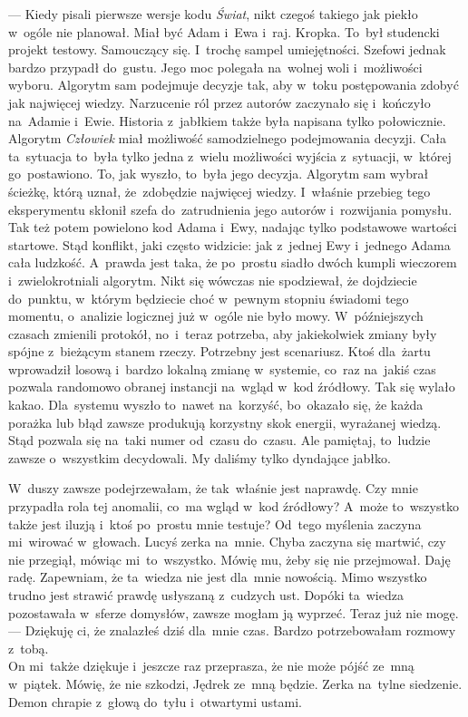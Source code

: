 \documentclass[9pt, a5paper]{memoir}
\begin{document}
--- Kiedy pisali pierwsze wersje kodu \textit{Świat}, nikt czegoś takiego jak piekło w~ogóle nie planował. Miał być Adam i~Ewa i~raj. Kropka. To~był studencki projekt testowy. Samouczący się. I~trochę sampel umiejętności. Szefowi jednak bardzo przypadł do~gustu. Jego moc polegała na~wolnej woli i~możliwości wyboru. Algorytm sam podejmuje decyzje tak, aby w~toku postępowania zdobyć jak najwięcej wiedzy. Narzucenie ról przez autorów zaczynało się i~kończyło na~Adamie i~Ewie. Historia z~jabłkiem także była napisana tylko połowicznie. Algorytm \textit{Człowiek} miał możliwość samodzielnego podejmowania decyzji. Cała ta~sytuacja to~była tylko jedna z~wielu możliwości wyjścia z~sytuacji, w~której go~postawiono. To, jak wyszło, to~była jego decyzja. Algorytm sam wybrał ścieżkę, którą uznał, że~zdobędzie najwięcej wiedzy. I~właśnie przebieg tego eksperymentu skłonił szefa do~zatrudnienia jego autorów i~rozwijania pomysłu. Tak też potem powielono kod Adama i~Ewy, nadając tylko podstawowe wartości startowe. Stąd konflikt, jaki często widzicie: jak z~jednej Ewy i~jednego Adama cała ludzkość. A~prawda jest taka, że po~prostu siadło dwóch kumpli wieczorem i~zwielokrotniali algorytm. Nikt się wówczas nie spodziewał, że dojdziecie do~punktu, w~którym będziecie choć w~pewnym stopniu świadomi tego momentu, o~analizie logicznej już w~ogóle nie było mowy. W~późniejszych czasach zmienili protokół, no~i~teraz potrzeba, aby jakiekolwiek zmiany były spójne z~bieżącym stanem rzeczy. Potrzebny jest scenariusz. Ktoś dla~żartu wprowadził losową i~bardzo lokalną zmianę w~systemie, co~raz na~jakiś czas pozwala randomowo obranej instancji na~wgląd w~kod źródłowy. Tak się wylało kakao. Dla~systemu wyszło to~nawet na~korzyść, bo~okazało się, że każda porażka lub błąd zawsze produkują korzystny skok energii, wyrażanej wiedzą. Stąd pozwala się na~taki numer od~czasu do~czasu. Ale pamiętaj, to~ludzie zawsze o~wszystkim decydowali. My daliśmy tylko dyndające jabłko.

W~duszy zawsze podejrzewałam, że tak~właśnie jest naprawdę. Czy mnie przypadła rola tej anomalii, co~ma wgląd w~kod źródłowy? A~może to~wszystko także jest iluzją i~ktoś po~prostu mnie testuje? Od~tego myślenia zaczyna mi~wirować w~głowach. Lucyś zerka na~mnie. Chyba zaczyna się martwić, czy nie przegiął, mówiąc mi~to~wszystko. Mówię mu, żeby się nie przejmował. Daję radę. Zapewniam, że ta~wiedza nie jest dla~mnie nowością. Mimo wszystko trudno jest strawić prawdę usłyszaną z~cudzych ust. Dopóki ta~wiedza pozostawała w~sferze domysłów, zawsze mogłam ją wyprzeć. Teraz już nie mogę.\\
--- Dziękuję ci, że znalazłeś dziś dla~mnie czas. Bardzo potrzebowałam rozmowy z~tobą.\\
On mi~także dziękuje i~jeszcze raz przeprasza, że nie może pójść ze~mną w~piątek. Mówię, że nie szkodzi, Jędrek ze~mną będzie. Zerka na~tylne siedzenie. Demon chrapie z~głową do~tyłu i~otwartymi ustami.
\end{document}
